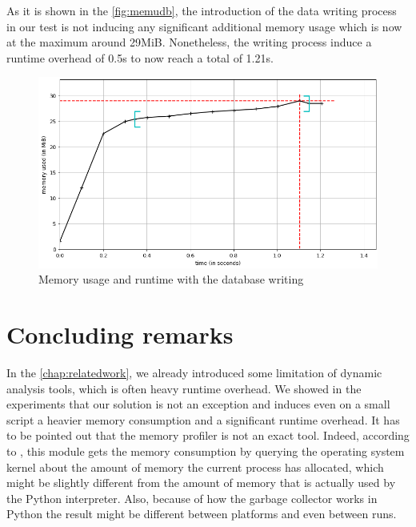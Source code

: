 As it is shown in the \autoref{fig:memudb}, the introduction of the data writing process in our test is not inducing any significant additional memory usage which is now at the maximum around 29MiB. Nonetheless, the writing process induce a runtime overhead of 0.5s to now reach a total of 1.21s.
\begin{figure}[h!]
  \centering
    \includegraphics[width=\textwidth]{figures/experiments_figure_db.png}
    \caption{Memory usage and runtime with the database writing}
    \label{fig:memudb}
\end{figure}

\section{Concluding remarks}

In the \autoref{chap:relatedwork}, we already introduced some limitation of dynamic analysis tools, which is often heavy runtime overhead. We showed in the experiments that our solution is not an exception and induces even on a small script a heavier memory consumption and a significant runtime overhead. It has to be pointed out that the memory profiler is not an exact tool. Indeed, according to \cite{Pedregos2016}, this module gets the memory consumption by querying the operating system kernel about the amount of memory the current process has allocated, which might be slightly different from the amount of memory that is actually used by the Python interpreter. Also, because of how the garbage collector works in Python the result might be different between platforms and even between runs.
